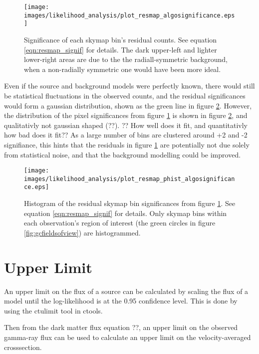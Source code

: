   \begin{figure}[ht]
    \centering
    \texttt{[image: images/likelihood\_analysis/plot\_resmap\_algosignificance.eps]}
    \caption[Galactic Center Residual Map]
    {
      Significance of each skymap bin's residual counts.
      See equation \ref{eqn:resmap_signif} for details.
      The dark upper-left and lighter lower-right areas are due to the the radiall-symmetric background, when a non-radially symmetric one would have been more ideal.
    }
    \label{fig:gc_resmap}
  \end{figure}

  Even if the source and background models were perfectly known, there would still be statistical fluctuations in the observed counts, and the residual significances would form a gaussian distribution, shown as the green line in figure \ref{fig:gc_resmap_sighist}.
  However, the distribution of the pixel significances from figure \ref{fig:gc_resmap} is shown in figure \ref{fig:gc_resmap_sighist}, and qualitativly not gaussian shaped (??).
  ?? How well does it fit, and quantitativly how bad does it fit??
  As a large number of bins are clustered around +2 and -2 signifiance, this hints that the residuals in figure \ref{fig:gc_resmap} are potentially not due solely from statistical noise, and that the background modelling could be improved.
  
  \begin{figure}[ht]
    \centering
    \texttt{[image: images/likelihood\_analysis/plot\_resmap\_phist\_algosignificance.eps]}
    \caption[Galactic Center Residual Histogram]
    {
      Histogram of the residual skymap bin significances from figure \ref{fig:gc_resmap}.
      See equation \ref{eqn:resmap_signif} for details.
      Only skymap bins within each observation's region of interest (the green circles in figure \ref{fig:gcfieldsofview}) are histogrammed.
    }
    \label{fig:gc_resmap_sighist}
  \end{figure}
  
\section{Upper Limit}
  An upper limit on the flux of a source can be calculated by scaling the flux of a model until the log-likelihood is at the 0.95 confidence level.
  This is done by using the ctulimit tool in ctools.
  
  Then from the dark matter flux equation ??, an upper limit on the observed gamma-ray flux can be used to calculate an upper limit on the velocity-averaged crosssection.
  
